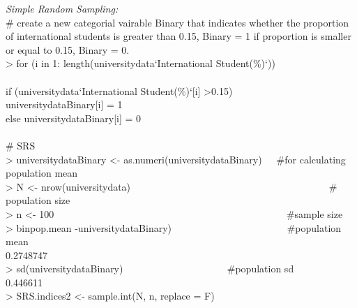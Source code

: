 \documentclass{article}
\begin{document}
\noindent\textit{Simple Random Sampling:}\\
\# create a new categorial vairable Binary that indicates whether the proportion of international students is greater than 0.15, Binary = 1 if proportion is smaller or equal to 0.15, Binary = 0.\\
\textgreater\hspace{1mm} for (i in 1: length(universitydata\textdollar`International Student(\%)`))\\
\hspace{1mm} \textbraceleft\\
\hspace{1mm} if (universitydata\textdollar`International Student(\%)`[i] \textgreater0.15) \textbraceleft\\
\hspace{1mm} universitydata\textdollar Binary[i] = 1 \textbraceright\\
\hspace{1mm} else \textbraceleft universitydata\textdollar Binary[i] = 0 \textbraceright\\
\hspace{1mm}  \textbraceright\\
\# SRS\\
\textgreater\hspace{1mm} universitydata\textdcollar Binary \textless- as.numeri(universitydata\textdollar Binary)~~~\#for calculating population mean\\
\textgreater\hspace{1mm} N \textless- nrow(universitydata) ~~~~~~~~~~~~~~~~~~~~~~~~~~~~~~~~~~~~~~~~\# population size\\
\textgreater\hspace{1mm} n \textless- 100 ~~~~~~~~~~~~~~~~~~~~~~~~~~~~~~~~~~~~~~~~~~~~~~~\#sample size\\
\textgreater\hspace{1mm} binpop.mean \textleft-universitydata\textdollar Binary) ~~~~~~~~~~~~~~~~~~~~~~~\#population mean\\
\hspace{1mm} 0.2748747\\
\textgreater\hspace{1mm} sd(universitydata\textdcollar Binary) ~~~~~~~~~~~~~~~~~~~~ \#population sd\\
\hspace{1mm} 0.446611\\
\textgreater\hspace{1mm} SRS.indices2 \textless- sample.int(N, n, replace = F)\\
\end{document}
